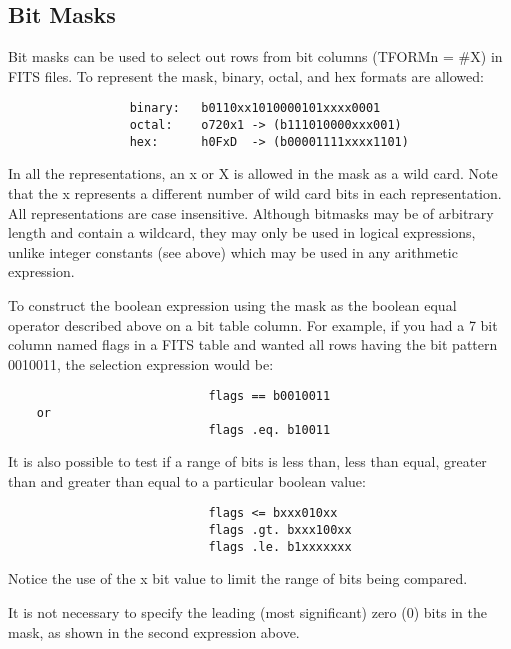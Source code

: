 \documentclass[11pt]{book}
\begin{document}
\subsection{Bit Masks}

    Bit  masks can be used to select out rows from bit columns (TFORMn =
    \#X) in FITS files. To represent the mask,  binary,  octal,  and  hex
    formats are allowed:


\begin{verbatim}
                 binary:   b0110xx1010000101xxxx0001
                 octal:    o720x1 -> (b111010000xxx001)
                 hex:      h0FxD  -> (b00001111xxxx1101)
\end{verbatim}

    In  all  the  representations, an x or X is allowed in the mask as a
    wild card. Note that the x represents a  different  number  of  wild
    card  bits  in  each  representation.  All  representations are case
    insensitive.  Although bitmasks may be of arbitrary length and contain
    a wildcard, they may only be used in logical expressions, unlike 
    integer constants (see above) which may be used in any arithmetic
    expression.

    To construct the boolean expression using the mask  as  the  boolean
    equal  operator  described above on a bit table column. For example,
    if you had a 7 bit column named flags in a  FITS  table  and  wanted
    all  rows  having  the bit pattern 0010011, the selection expression
    would be:


\begin{verbatim}
                            flags == b0010011
    or
                            flags .eq. b10011
\end{verbatim}

    It is also possible to test if a range of bits is  less  than,  less
    than  equal,  greater  than  and  greater than equal to a particular
    boolean value:


\begin{verbatim}
                            flags <= bxxx010xx
                            flags .gt. bxxx100xx
                            flags .le. b1xxxxxxx
\end{verbatim}

    Notice the use of the x bit value to limit the range of  bits  being
    compared.

    It  is  not necessary to specify the leading (most significant) zero
    (0) bits in the mask, as shown in the second expression above.
\end{document}
